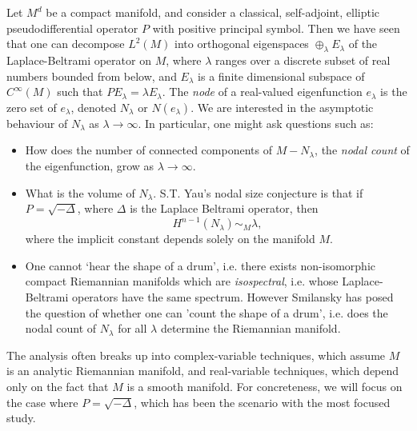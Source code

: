 Let $M^d$ be a compact manifold, and consider a classical, self-adjoint, elliptic pseudodifferential operator $P$ with positive principal symbol. Then we have seen that one can decompose $L^2(M)$ into orthogonal eigenspaces $\oplus_\lambda E_\lambda$ of the Laplace-Beltrami operator on $M$, where $\lambda$ ranges over a discrete subset of real numbers bounded from below, and $E_\lambda$ is a finite dimensional subspace of $C^\infty(M)$ such that $P E_\lambda = \lambda E_\lambda$. The \emph{node} of a real-valued eigenfunction $e_\lambda$ is the zero set of $e_\lambda$, denoted $N_\lambda$ or $N(e_\lambda)$. We are interested in the asymptotic behaviour of $N_\lambda$ as $\lambda \to \infty$. In particular, one might ask questions such as:
%
\begin{itemize}
    \item How does the number of connected components of $M - N_\lambda$, the \emph{nodal count} of the eigenfunction, grow as $\lambda \to \infty$.

    \item What is the volume of $N_\lambda$. S.T. Yau's nodal size conjecture is that if $P = \sqrt{-\Delta}$, where $\Delta$ is the Laplace Beltrami operator, then
    \[ H^{n-1}(N_\lambda) \sim_M \lambda, \]
    where the implicit constant depends solely on the manifold $M$.

    \item One cannot `hear the shape of a drum', i.e. there exists non-isomorphic compact Riemannian manifolds which are \emph{isospectral}, i.e. whose Laplace-Beltrami operators have the same spectrum. However Smilansky has posed the question of whether one can 'count the shape of a drum', i.e. does the nodal count of $N_\lambda$ for all $\lambda$ determine the Riemannian manifold.
\end{itemize}
%
The analysis often breaks up into complex-variable techniques, which assume $M$ is an analytic Riemannian manifold, and real-variable techniques, which depend only on the fact that $M$ is a smooth manifold. For concreteness, we will focus on the case where $P = \sqrt{-\Delta}$, which has been the scenario with the most focused study.

